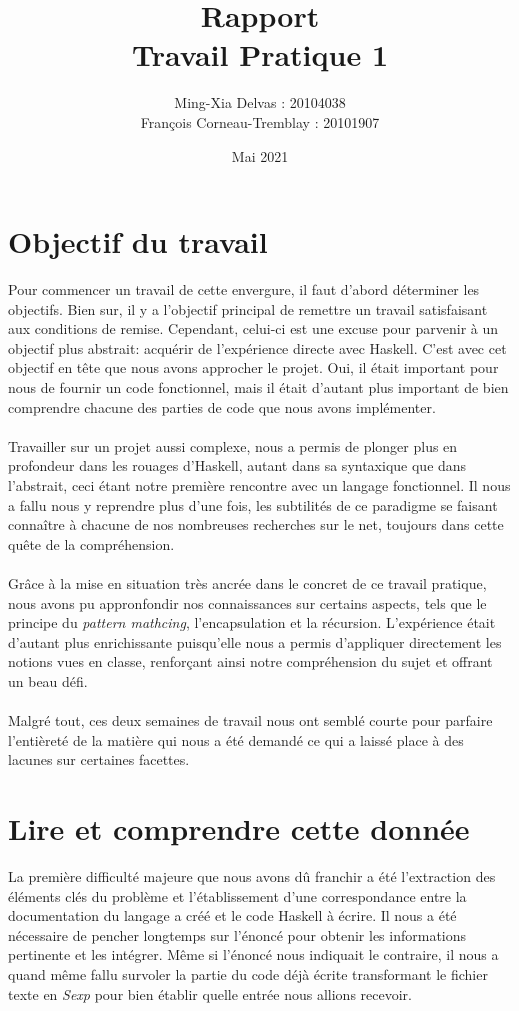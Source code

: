 \documentclass{article}
\title{Rapport\\ Travail Pratique 1}
\author{Ming-Xia Delvas : 20104038\\
François Corneau-Tremblay : 20101907}
\date{Mai 2021}
\begin{document}
\maketitle

\section{Objectif du travail}
Pour commencer un travail de cette envergure, il faut d'abord déterminer les objectifs. Bien sur, il y a l'objectif principal de remettre un travail satisfaisant aux conditions de remise. Cependant, celui-ci est une excuse pour parvenir à un objectif plus abstrait: acquérir de l'expérience directe avec Haskell. C'est avec cet objectif en tête que nous avons approcher le projet. Oui, il était important pour nous de fournir un code fonctionnel, mais il était d'autant plus important de bien comprendre chacune des parties de code que nous avons implémenter.\\\\

Travailler sur un projet aussi complexe, nous a permis de plonger plus en profondeur dans les rouages d'Haskell, autant dans sa syntaxique que dans l'abstrait, ceci étant notre première rencontre avec un langage fonctionnel. Il nous a fallu nous y reprendre plus d'une fois, les subtilités de ce paradigme se faisant connaître à chacune de nos nombreuses recherches sur le net, toujours dans cette quête de la compréhension.\\\\


Grâce à la mise en situation très ancrée dans le concret de ce travail pratique, nous avons pu appronfondir nos connaissances sur certains aspects, tels que le principe du \textit{pattern mathcing}, l'encapsulation et la récursion. L'expérience était d'autant plus enrichissante puisqu'elle nous a permis d'appliquer directement les notions vues en classe, renforçant ainsi notre compréhension du sujet et offrant un beau défi.\\\\


Malgré tout, ces deux semaines de travail nous ont semblé courte pour parfaire l'entièreté de la matière qui nous a été demandé ce qui a laissé place à des lacunes sur certaines facettes.


\section{Lire et comprendre cette donnée}
La première difficulté majeure que nous avons dû franchir a été l'extraction des éléments clés du problème et l'établissement d'une correspondance entre la documentation du langage a créé et le code Haskell à écrire. Il nous a été nécessaire de pencher longtemps sur l'énoncé pour obtenir les informations pertinente et les intégrer. Même si l'énoncé nous indiquait le contraire, il nous a quand même fallu survoler la partie du code déjà écrite transformant le fichier texte en \textit{Sexp} pour bien établir quelle entrée nous allions recevoir.\\\\
\end{document}
